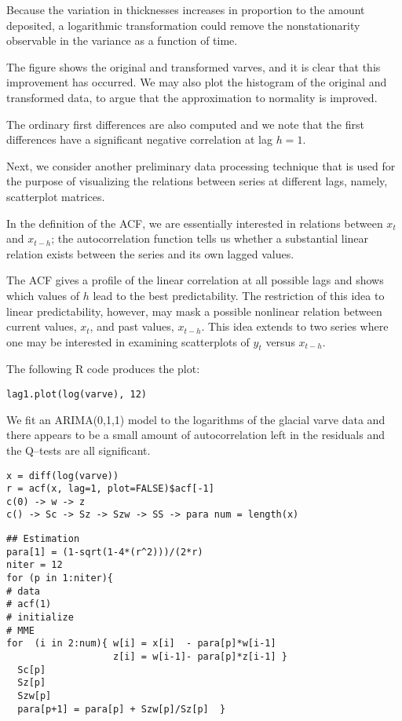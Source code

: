 \documentclass[
paper=128mm:96mm, %
fontsize=9.5pt, %
pagesize, %
parskip=half-, %
]{scrartcl} %
\theoremstyle{mythmstyle} %
\begin{document}
Because the variation in thicknesses increases in proportion to the amount deposited, a logarithmic transformation could remove the nonstationarity observable in the variance as a function of time. 

The figure shows the original and transformed varves, and it is clear that this improvement has occurred. We may also plot the histogram of the original and transformed data, to argue that the approximation to normality is improved. 

The ordinary first differences are also computed and we note that the first differences have a significant negative correlation at lag $h = 1$. 
\clearpage

Next, we consider another preliminary data processing technique that is used for the purpose of visualizing the relations between series at different lags, namely, scatterplot matrices. 

In the definition of the ACF, we are essentially interested in relations between $x_t$ and $x_{t-h}$; the autocorrelation function tells us whether a substantial linear relation exists between the series and its own lagged values. 

The ACF gives a profile of the linear correlation at all possible lags and shows which values of $h$ lead to the best predictability. The restriction of this idea to linear predictability, however, may mask a possible nonlinear relation between current values, $x_t$, and past values, $x_{t-h}$. This idea extends to two series where one may be interested in examining scatterplots of $y_t$ versus $x_{t-h}$.

The following R code produces the plot:
%
\begin{lstlisting}[belowskip=-0.8 \baselineskip]
lag1.plot(log(varve), 12)
\end{lstlisting}
%
\clearpage

We fit an ARIMA(0,1,1) model to the logarithms of the glacial varve data and there appears to be a small amount of autocorrelation left in the residuals and the Q--tests are all significant.
%
\begin{lstlisting}[belowskip=-0.8 \baselineskip]
x = diff(log(varve))
r = acf(x, lag=1, plot=FALSE)$acf[-1] 
c(0) -> w -> z
c() -> Sc -> Sz -> Szw -> SS -> para num = length(x)
\end{lstlisting}
%
\clearpage


\begin{lstlisting}[belowskip=-0.8 \baselineskip]
## Estimation
para[1] = (1-sqrt(1-4*(r^2)))/(2*r) 
niter = 12
for (p in 1:niter){
# data
# acf(1)
# initialize
# MME
for  (i in 2:num){ w[i] = x[i]  - para[p]*w[i-1]
                   z[i] = w[i-1]- para[p]*z[i-1] }
  Sc[p]
  Sz[p]
  Szw[p]
  para[p+1] = para[p] + Szw[p]/Sz[p]  }
\end{lstlisting}
%
\clearpage
\end{document}
